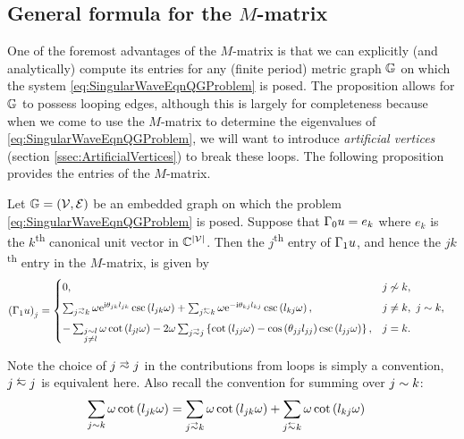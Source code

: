 \subsection{General formula for the $M$-matrix} \label{ssec:MMatrixResult}
One of the foremost advantages of the $M$-matrix is that we can explicitly (and analytically) compute its entries for any (finite period) metric graph $\mathbb{G}$ on which the system \eqref{eq:SingularWaveEqnQGProblem} is posed.
The proposition allows for $\mathbb{G}$ to possess looping edges, although this is largely for completeness because when we come to use the $M$-matrix to determine the eigenvalues of \eqref{eq:SingularWaveEqnQGProblem}, we will want to introduce \emph{artificial vertices} (section \ref{ssec:ArtificialVertices}) to break these loops.
The following proposition provides the entries of the $M$-matrix.
\begin{prop} \label{prop:M-MatrixEntries}
	Let $\mathbb{G}=\left( \mathcal{V},\mathcal{E} \right)$ be an embedded graph on which the problem \eqref{eq:SingularWaveEqnQGProblem} is posed.
	Suppose that $\Gamma_0 u = e_k$ where $e_k$ is the $k$\textsuperscript{th} canonical unit vector in $\mathbb{C}^{\left\lvert \mathcal{V} \right\rvert}$.
	Then the $j$\textsuperscript{th} entry of $\Gamma_1 u$, and hence the $jk$\textsuperscript{th} entry in the $M$-matrix, is given by
	\begin{align*}
		\bracs{\nmap u}_j &= 
		\begin{cases}
			0,	
			& j \not\con k, \\[5pt]
			\sum_{j\conLeft k} \omega \e^{\rmi\qm_{jk}l_{jk}} \csc\bracs{l_{jk}\omega} 
			+ \sum_{j\conRight k} \omega \e^{-\rmi\qm_{kj}l_{kj}} \csc\bracs{l_{kj}\omega},
			& j\neq k, \ j\con k, \\[5pt]
			- \sum_{\substack{j\con l \\ j\neq l}} \omega\cot\bracs{l_{jl}\omega}
			- 2\omega\sum_{j\conLeft j} \clbracs{ \cot\bracs{l_{jj}\omega} - \cos\bracs{\qm_{jj}l_{jj}}\csc\bracs{l_{jj}\omega} },
			& j=k.
		\end{cases}
	\end{align*}
\end{prop}
Note the choice of $j\conLeft j$ in the contributions from loops is simply a convention, $j\conRight j$ is equivalent here.
Also recall the convention for summing over $j\sim k$:
\begin{align*}
	\sum_{j\con k} \omega\cot\bracs{l_{jk}\omega} &= \sum_{j\conLeft k} \omega\cot\bracs{l_{jk}\omega}	+ \sum_{j\conRight k} \omega\cot\bracs{l_{kj}\omega}
\end{align*}
